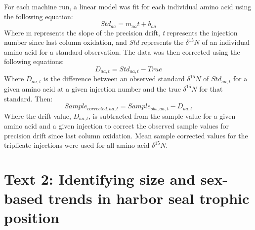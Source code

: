 \documentclass [11pt, proquest] {uwthesis}[2015/03/03]
\begin{document}
For each machine run, a linear model was fit for each individual amino
acid using the following equation:
\begin{equation} 
  Std_{aa} = m_{aa}t + b_{aa}
  \label{eq:std}
\end{equation}
Where m represents the slope of the precision drift, \emph{t} represents
the injection number since last column oxidation, and \emph{Std}
represents the \(\delta^{15}N\) of an individual amino acid for a
standard observation. The data was then corrected using the following
equations:
\begin{equation} 
  D_{aa, t} = Std_{aa,t} - True
  \label{eq:diff}
\end{equation}
Where \(D_{aa,t}\) is the difference between an observed standard
\(\delta^{15}N\) of \(Std_{aa,t}\) for a given amino acid at a given
injection number and the true \(\delta^{15}N\) for that standard. Then:
\begin{equation} 
  Sample_{corrected,aa,t} = Sample_{obs,aa,t} - D_{aa,t}
  \label{eq:sampcorr}
\end{equation}
Where the drift value, \(D_{aa,t}\), is subtracted from the sample value
for a given amino acid and a given injection to correct the observed
sample values for precision drift since last column oxidation. Mean
sample corrected values for the triplicate injections were used for all
amino acid \(\delta^{15}N\).

\section{Text 2: Identifying size and sex-based trends in harbor seal
trophic
position}\label{text-2-identifying-size-and-sex-based-trends-in-harbor-seal-trophic-position}
\end{document}
